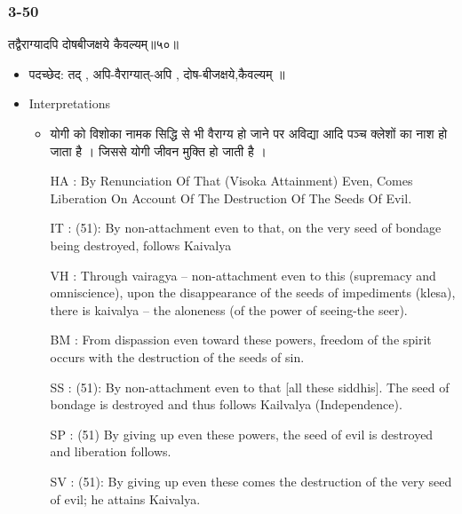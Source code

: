 \begin{frame}[fragile]\frametitle{3-50}
\begin{sanskrit}
तद्वैराग्यादपि दोषबीजक्षये कैवल्यम्॥५०॥
\end{sanskrit}

	\begin{itemize}
	\item पदच्छेद:  तद् , अपि-वैराग्यात्-अपि , दोष-बीजक्षये,कैवल्यम् ॥
	\item Interpretations
		\begin{itemize}	
		\item योगी को विशोका नामक सिद्धि से भी वैराग्य हो जाने पर अविद्या आदि पञ्च क्लेशों का नाश हो जाता है । जिससे योगी जीवन मुक्ति हो जाती है ।
		\item [HA]: By Renunciation Of That (Visoka Attainment) Even, Comes Liberation On Account Of The Destruction Of The Seeds Of Evil.
		\item [IT]: (51): By non-attachment even to that, on the very seed of bondage being destroyed, follows Kaivalya
		\item [VH]: Through vairagya – non-attachment even to this (supremacy and omniscience), upon the disappearance of the seeds of impediments (klesa), there is kaivalya – the aloneness (of the power of seeing-the seer).
		\item [BM]: From dispassion even toward these powers, freedom of the spirit occurs with the destruction of the seeds of sin.
		\item [SS]: (51): By non-attachment even to that [all these siddhis]. The seed of bondage is destroyed and thus follows Kailvalya (Independence).
		\item [SP]: (51) By giving up even these powers, the seed of evil is destroyed and liberation follows.
		\item [SV]: (51): By giving up even these comes the destruction of the very seed of evil; he attains Kaivalya. 
		\end{itemize}
	\end{itemize}
\end{frame}


